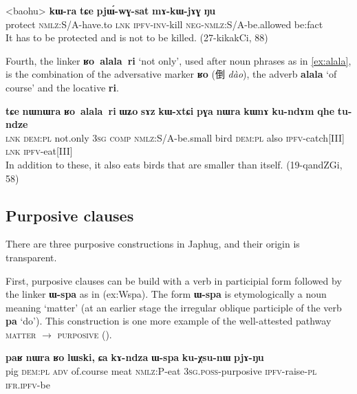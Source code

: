 \documentclass[oldfontcommands,oneside,a4paper,11pt]{article}
\newcommand{\ipa}[1]{\mbox{\phon\textbf{#1}}} %
\newcommand{\zh}[1]{{\cn #1}}
\begin{document}
 \begin{exe}
\ex \label{ex:mAkWjAG2}
\gll
<baohu> 	\ipa{kɯ-ra} 	\ipa{tɕe} 	\ipa{pjɯ́-wɣ-sat} 	\ipa{mɤ-kɯ-jɤɣ} \ipa{ŋu} \\
protect \textsc{nmlz}:S/A-have.to \textsc{lnk} \textsc{ipfv-inv}-kill \textsc{neg-nmlz}:S/A-be.allowed be:fact \\ 
\glt It has to be protected and is not to be killed. (27-kikakCi, 88)
\end{exe}

Fourth, the linker \ipa{ʁo alala ri} `not only', used after noun phrases as in \ref{ex:alala}, is the combination of the adversative marker \ipa{ʁo} (\zh{倒}  \textit{dào}), the adverb \ipa{alala} `of course' and the locative \ipa{ri}.

 \begin{exe}
\ex \label{ex:alala}
\gll  \ipa{tɕe} 	\ipa{nɯnɯra} 	\ipa{ʁo alala ri} 	\ipa{ɯʑo} 	\ipa{sɤz} 	\ipa{kɯ-xtɕi} 	\ipa{pɣa} 	\ipa{nɯra} 	\ipa{kɯnɤ} 	\ipa{ku-ndɤm} 	\ipa{qhe} 	\ipa{tu-ndze} \\
\textsc{lnk} \textsc{dem:pl} not.only \textsc{3sg} \textsc{comp} \textsc{nmlz}:S/A-be.small bird \textsc{dem:pl} also \textsc{ipfv}-catch[III] \textsc{lnk} \textsc{ipfv}-eat[III] \\
\glt In addition to these, it also eats birds that are smaller than itself. (19-qandZGi, 58)
\end{exe}

 \subsection{Purposive clauses}
There are three purposive constructions in Japhug, and their origin is transparent.

   First, purposive clauses can be build with a verb in participial form followed by the linker \ipa{ɯ-spa} as in ({ex:Wspa}).  The form \ipa{ɯ-spa} is etymologically a noun meaning `matter' (at an earlier stage the irregular oblique participle of the verb \ipa{pa} `do'). This construction is one more example of the well-attested pathway \textsc{matter} $\rightarrow$ \textsc{purposive} (\citealt[212]{heine-kuteva02}).


\begin{exe}
\ex \label{ex:Wspa}
\gll \ipa{paʁ} 	\ipa{nɯra} 	\ipa{ʁo} 	\ipa{lɯski,} 	\ipa{ɕa} 	\ipa{kɤ-ndza} 	\ipa{ɯ-spa} 	\ipa{ku-χsu-nɯ} 	\ipa{pjɤ-ŋu}  \\
pig \textsc{dem:pl} \textsc{adv} of.course meat \textsc{nmlz}:P-eat \textsc{3sg.poss}-purposive \textsc{ipfv}-raise-\textsc{pl} \textsc{ifr.ipfv}-be \\
\glt 
\end{exe}
 
\end{document}
